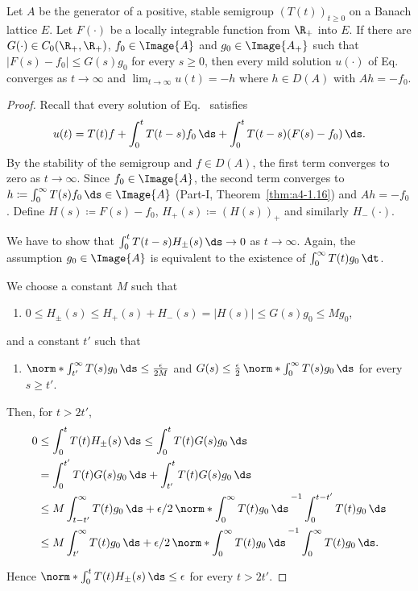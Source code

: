 \begin{proposition}\label{prop:c4-1.11}
Let $A$ be the generator of a positive, stable semigroup $(T(t))_{t \geq 0}$ on a Banach lattice $E$.
Let $F(\cdot)$ be a locally integrable function from $\R_{+}$ into $E$.
If there are $G(\cdot) \in C_{0}(\R_{+},\R_{+})$, $f_{0} \in  \Image{A}$ and $g_{0} \in \Image{A_{+}}$ such that $|F(s) - f_{0}| \leq G(s)g_{0}$ for every $s \geq 0$, then every mild solution $u(\cdot)$ of Eq.~ converges as $t \to \infty$ and $\lim_{t \to \infty} u(t) = -h$ where $h \in D(A)$ with $Ah = -f_{0}$.
\end{proposition}
\begin{proof}
Recall that every solution of Eq.~ satisfies
\begin{equation}\label{eq:c4-1.7}
u(t) = T(t)f + \int_{0}^{t} T(t-s)f_{0} \, \ds + \int_{0}^{t} T(t-s)(F(s) - f_{0}) \, \ds.
\end{equation}
By the stability of the semigroup and $f \in D(A)$, the first term converges to zero as $t \to \infty$.
Since $f_{0} \in \Image{A}$, the second term converges to $h \coloneqq  \int_{0}^{\infty} T(s)f_{0} \, \ds \in \Image{A}$ (Part-I, Theorem~\ref{thm:a4-1.16}) and $Ah = -f_{0}$.
Define $H(s) \coloneqq F(s) - f_{0}$, 
$ H_{+}(s) \coloneqq (H(s))_{+} $ 
and similarly $H_{-}(\cdot)$.

We have to show that $\int_{0}^{t} T(t-s)H_{\pm}(s) \, \ds \to 0$ as $t \to \infty$.
Again, the assumption $g_{0} \in \Image{A}$ is equivalent to the existence of\/ $\int_{0}^{\infty} T(t)g_{0} \, \dt$.

We choose a constant $M$  such that 
\begin{enumerate}[\upshape (i)]
    \item 
    $0 \leq H_{\pm}(s) \leq H_{+}(s) + H_{-}(s) = |H(s)| \leq G(s)g_{0} \leq Mg_{0}$,
\end{enumerate}
and a constant $t'$ such that
\begin{enumerate}
    \item $ \norm*{\int_{t'}^{\infty} T(s)g_{0} \, \ds} \leq \frac{\epsilon}{2M}$ and  
$G(s) \leq \frac{\epsilon}{2} \,  \norm*{\int_{0}^{\infty} T(s)g_{0} \, \ds}$ for every $s \geq t'$.
\end{enumerate}
Then, for $t > 2t'$,
\begin{align*}
0 &\leq \int_{0}^{t} T(t)H_{\pm}(s) \, \ds \leq \int_{0}^{t} T(t)G(s)g_{0} \, \ds\\
&= \int_{0}^{t'} T(t)G(s)g_{0} \, \ds + \int_{t'}^{t} T(t)G(s)g_{0} \, \ds\\
&\leq M \int_{t-t'}^{\infty} T(t)g_{0} \, \ds + \epsilon/2 \,  \norm*{\int_{0}^{\infty} T(t)g_{0} \, \ds\, }^{-1} \int_{0}^{t-t'} T(t)g_{0} \, \ds\\
&\leq M \int_{t'}^{\infty} T(t)g_{0} \, \ds + \epsilon/2 \,  \norm*{\int_{0}^{\infty} T(t)g_{0} \, \ds\, }^{-1} \int_{0}^{\infty} T(t)g_{0} \, \ds.
\end{align*}

Hence $\norm*{\int_{0}^{t} T(t)H_{\pm}(s) \, \ds} \leq \epsilon$ for every $t > 2t'$.
\end{proof}

